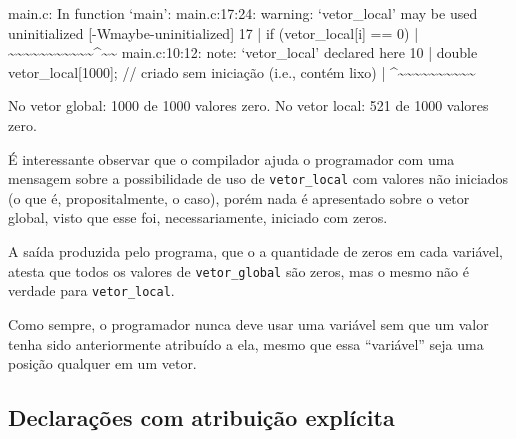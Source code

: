 \documentclass[
  11pt,
  a4paper,
]{scrbook}
\newenvironment{Shaded}{\begin{snugshade}}{\end{snugshade}}
\newcommand{\NormalTok}[1]{#1}
\begin{document}
\begin{Shaded}
\begin{Highlighting}[]
\NormalTok{main.c: In function ‘main’:}
\NormalTok{main.c:17:24: warning: ‘vetor\_local’ may be used uninitialized }
\NormalTok{[{-}Wmaybe{-}uninitialized]}
\NormalTok{   17 |         if (vetor\_local[i] == 0)}
\NormalTok{      |             \textasciitilde{}\textasciitilde{}\textasciitilde{}\textasciitilde{}\textasciitilde{}\textasciitilde{}\textasciitilde{}\textasciitilde{}\textasciitilde{}\textasciitilde{}\textasciitilde{}\^{}\textasciitilde{}\textasciitilde{}}
\NormalTok{main.c:10:12: note: ‘vetor\_local’ declared here}
\NormalTok{   10 |     double vetor\_local[1000];  // criado sem iniciação (i.e., }
\NormalTok{contém lixo)}
\NormalTok{      |            \^{}\textasciitilde{}\textasciitilde{}\textasciitilde{}\textasciitilde{}\textasciitilde{}\textasciitilde{}\textasciitilde{}\textasciitilde{}\textasciitilde{}\textasciitilde{}}
\end{Highlighting}
\end{Shaded}

\begin{Shaded}
\begin{Highlighting}[]
\NormalTok{No vetor global: 1000 de 1000 valores zero.}
\NormalTok{No vetor local: 521 de 1000 valores zero.}
\end{Highlighting}
\end{Shaded}

É interessante observar que o compilador ajuda o programador com uma
mensagem sobre a possibilidade de uso de \texttt{vetor\_local} com
valores não iniciados (o que é, propositalmente, o caso), porém nada é
apresentado sobre o vetor global, visto que esse foi, necessariamente,
iniciado com zeros.

A saída produzida pelo programa, que o a quantidade de zeros em cada
variável, atesta que todos os valores de \texttt{vetor\_global} são
zeros, mas o mesmo não é verdade para \texttt{vetor\_local}.

Como sempre, o programador nunca deve usar uma variável sem que um valor
tenha sido anteriormente atribuído a ela, mesmo que essa ``variável''
seja uma posição qualquer em um vetor.

\subsection{Declarações com atribuição
explícita}\label{declarauxe7uxf5es-com-atribuiuxe7uxe3o-expluxedcita}
\end{document}
